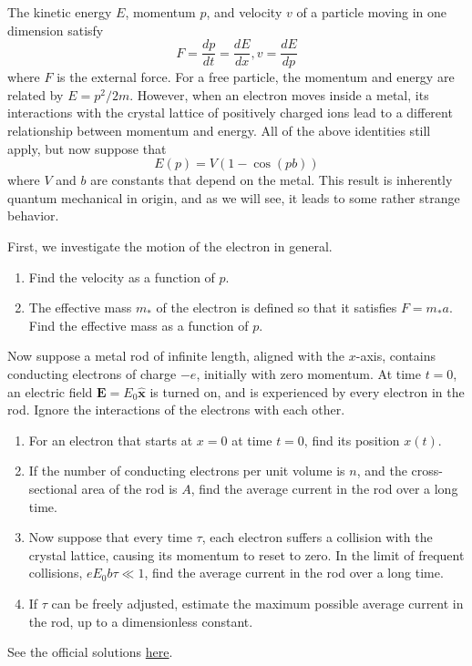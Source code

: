 \documentclass[11pt]{scrartcl}
\newcommand{\officialsol}[1]{See the official solutions \href{#1}{here}.}
\begin{document}
\begin{prob}[USAPhO 2022/B3]
    The kinetic energy $E$, momentum $p$, and velocity $v$ of a particle moving in one dimension satisfy
    $$F = \frac{dp}{dt} = \frac{dE}{dx}, v = \frac{dE}{dp}$$
    where $F$ is the external force. For a free particle, the momentum and energy are related by $E = p^2/2m$. However, when an electron moves inside a metal, its interactions with the crystal
lattice of positively charged ions lead to a different relationship between momentum and energy. All
of the above identities still apply, but now suppose that
$$E(p) = V(1-\cos (pb))$$
where $V$ and $b$ are constants that depend on the metal. This result is inherently quantum mechanical
in origin, and as we will see, it leads to some rather strange behavior.
\begin{anum}
    \item First, we investigate the motion of the electron in general.
    \begin{enumerate}[label=\roman*.]
        \item Find the velocity as a function of $p$.
        \item The effective mass $m_*$ of the electron is defined so that it satisfies $F = m_* a$. Find the effective
mass as a function of $p$.
    \end{enumerate}
    \item Now suppose a metal rod of infinite length, aligned with the $x$-axis, contains conducting electrons
of charge $-e$, initially with zero momentum. At time $t = 0$, an electric field $\mathbf E = E_0 \hat{\mathbf x}$ is turned
on, and is experienced by every electron in the rod. Ignore the interactions of the electrons with
each other.
\begin{enumerate}[label=\roman*.]
    \item For an electron that starts at $x = 0$ at time $t = 0$, find its position $x(t)$.
    \item If the number of conducting electrons per unit volume is $n$, and the cross-sectional area of the
rod is $A$, find the average current in the rod over a long time.
    \item Now suppose that every time $\tau$, each electron suffers a collision with the crystal lattice, causing
its momentum to reset to zero. In the limit of frequent collisions, $eE_0 b \tau \ll 1$, find the average
current in the rod over a long time.
\item If $\tau$ can be freely adjusted, estimate the maximum possible average current in the rod, up to
a dimensionless constant.
\end{enumerate}
\end{anum}
\end{prob}
\begin{sol}
    \officialsol{https://aapt.org/physicsteam/upload/2022-USAPhO-solutions.pdf}
\end{sol}
\end{document}
